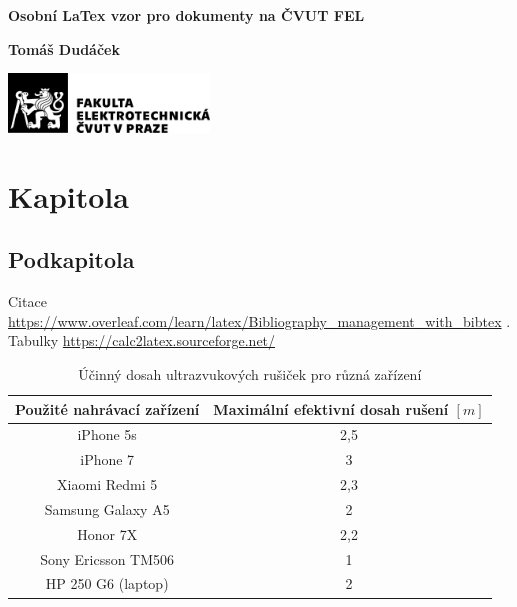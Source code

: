 \documentclass[]{article}
\author{Tomáš Dudáček}
\begin{document}
\begin{titlepage}
    \begin{center}
        \vspace*{1cm}
 
        \textbf{Osobní LaTex vzor pro dokumenty na ČVUT FEL}
        \vspace{1.5cm}
 
        \textbf{Tomáš Dudáček} 
        
 
        \vfill
             
        \vspace{0.8cm}
      
        \includegraphics[width=0.4\textwidth]{foto/logoFEL.jpg}  
    \end{center}
 \end{titlepage}



\tableofcontents

\pagebreak
\printacronyms[name=Zkratky]


\pagebreak

\section{Kapitola}
\subsection{Podkapitola}

Citace \href{https://www.overleaf.com/learn/latex/Bibliography_management_with_bibtex}{https://www.overleaf.com/learn/latex/Bibliography\_management\_with\_bibtex} 
\cite{PetitSieffermann2007}. \\
Tabulky \href{https://calc2latex.sourceforge.net/}{https://calc2latex.sourceforge.net/} \\

\begin{table}[H]
\centering
    \caption{\label{tab:table_dists} Účinný dosah ultrazvukových rušiček pro různá zařízení}
    \begin{tabular}{ |c|c| } 
     \hline
     Použité nahrávací zařízení & Maximální efektivní dosah rušení $[m]$ \\
     \hline
     iPhone 5s & 2,5 \\ 
     iPhone 7  & 3 \\ 
     Xiaomi Redmi 5 & 2,3 \\ 
     Samsung Galaxy A5 & 2 \\ 
     Honor 7X & 2,2 \\ 
     Sony Ericsson TM506 & 1 \\ 
     HP 250 G6 (laptop) & 2 \\ 
     \hline
    \end{tabular}
\end{table}
\end{document}
